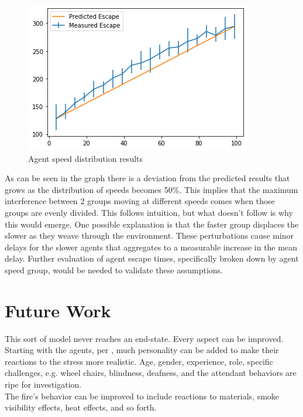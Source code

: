 \documentclass[12pt,letterpaper]{article}
\begin{document}
\begin{figure} [!ht]
  \centering
  \includegraphics[width=.75\linewidth]{./figures/speed_dist_test.png}
  \caption{Agent speed distribution results}
  \label{fig:speedResults}
\end{figure}

As can be seen in the graph there is a deviation from the predicted results that grows as the distribution of speeds becomes 50\%.  This implies that the maximum interference between 2 groups moving at different speeds comes when those groups are evenly divided.  This follows intuition, but what doesn't follow is why this would emerge.  One possible explanation is that the faster group displaces the slower as they weave through the environment.  These perturbations cause minor delays for the slower agents that aggregates to a measurable increase in the mean delay.  Further evaluation of agent escape times, specifically broken down by agent speed group, would be needed to validate these assumptions.


  
\section{Future Work}
This sort of model never reaches an end-state. Every aspect can be improved.
Starting with the agents, per \cite{almeidaCrowdSimulationModeling2013}, much
personality can be added to make their reactions to the stress more realistic.
Age, gender, experience, role, specific challenges, e.g. wheel chairs,
blindness, deafness, and the attendant behaviors are ripe for
investigation.\\

The fire's behavior can be improved to include reactions to materials, smoke
visibility effects, heat effects, and so forth. \\
\end{document}
